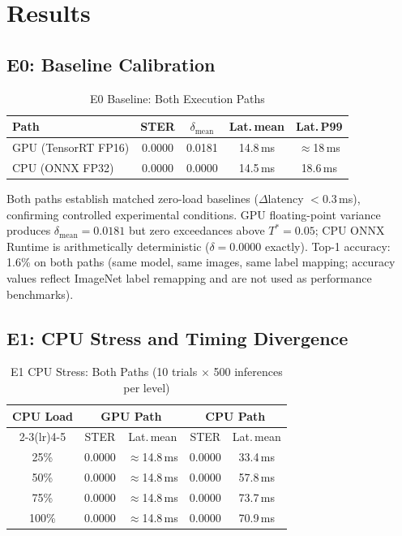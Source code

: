 \documentclass[journal,10pt,twocolumn]{IEEEtran}
\begin{document}
\section{Results}

\subsection{E0: Baseline Calibration}

\begin{table}[!t]
\caption{E0 Baseline: Both Execution Paths}
\label{tab:e0}
\centering
\small
\begin{tabular}{lcccc}
\toprule
\textbf{Path} & \textbf{STER} & \boldmath$\delta_\text{mean}$ & \textbf{Lat.\,mean} & \textbf{Lat.\,P99} \\
\midrule
GPU (TensorRT FP16) & 0.0000 & 0.0181 & 14.8\,ms & $\approx$18\,ms \\
CPU (ONNX FP32)     & 0.0000 & 0.0000 & 14.5\,ms & 18.6\,ms \\
\bottomrule
\end{tabular}
\end{table}

Both paths establish matched zero-load baselines ($\Delta$latency
${<}0.3$\,ms), confirming controlled experimental conditions.
GPU floating-point variance produces $\delta_\text{mean}{=}0.0181$ but
zero exceedances above $T^*{=}0.05$; CPU ONNX Runtime is
arithmetically deterministic ($\delta{=}0.0000$ exactly).
Top-1 accuracy: 1.6\% on both paths (same model, same images,
same label mapping; accuracy values reflect ImageNet label remapping
and are not used as performance benchmarks).

\subsection{E1: CPU Stress and Timing Divergence}

\begin{table}[!t]
\caption{E1 CPU Stress: Both Paths (10 trials $\times$ 500 inferences per level)}
\label{tab:e1}
\centering
\small
\begin{tabular}{ccccc}
\toprule
\multirow{2}{*}{\textbf{CPU Load}}
  & \multicolumn{2}{c}{\textbf{GPU Path}}
  & \multicolumn{2}{c}{\textbf{CPU Path}} \\
\cmidrule(lr){2-3}\cmidrule(lr){4-5}
  & STER & Lat.\,mean & STER & Lat.\,mean \\
\midrule
25\%  & 0.0000 & ${\approx}$14.8\,ms & 0.0000 & 33.4\,ms \\
50\%  & 0.0000 & ${\approx}$14.8\,ms & 0.0000 & 57.8\,ms \\
75\%  & 0.0000 & ${\approx}$14.8\,ms & 0.0000 & 73.7\,ms \\
100\% & 0.0000 & ${\approx}$14.8\,ms & 0.0000 & 70.9\,ms \\
\bottomrule
\end{tabular}
\end{table}
\end{document}
